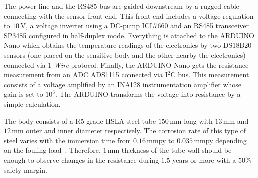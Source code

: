 \documentclass[journal,twoside,web]{ieeecolor}
\begin{document}
The power line and the RS485 bus are guided downstream by a rugged cable connecting with the sensor front-end. This front-end includes a voltage regulation to $10$\,V, a voltage inverter using a DC-pump ICL7660 and an RS485 transceiver SP3485 configured in half-duplex mode. Everything is attached to the ARDUINO Nano which obtains the temperature readings of the electronics by two DS18B20 sensors (one placed on the sensitive body and the other nearby the electronics) connected via $1$-\textit{Wire} protocol. Finally,  the ARDUINO Nano gets the resistance measurement from an ADC ADS1115 connected via I$^{2}$C bus. This measurement consists of a voltage amplified by an INA128 instrumentation amplifier whose gain is set to $10^{3}$. The ARDUINO transforms the voltage into resistance by a simple calculation. 

The body consists of a R5 grade HSLA steel tube $150$\,mm long with $13$\,mm and $12$\,mm outer and inner diameter respectively. The corrosion rate of this type of steel varies with the immersion time from $0.16$\,mmpy to $0.035$\,mmpy depending on the fouling load~\cite{palanichamy2014,blekkenhorst1986}. Therefore, $1$\,mm thickness of the tube wall should be enough to observe changes in the resistance during $1.5$ years or more with a $50\%$ safety margin.
\end{document}
